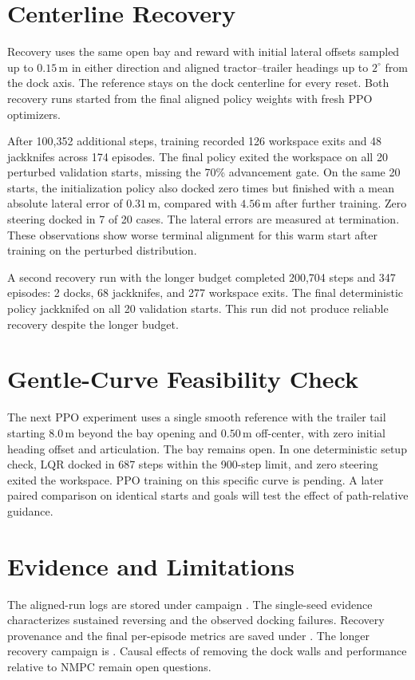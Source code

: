 \documentclass[conference]{IEEEtran}
\begin{document}
\section{Centerline Recovery}
Recovery uses the same open bay and reward with initial lateral offsets
sampled up to $0.15\,\mathrm{m}$ in either direction and aligned
tractor--trailer headings up to $2^\circ$ from the dock axis. The reference
stays on the dock centerline for every reset. Both recovery runs started from
the final aligned policy weights with fresh PPO optimizers.

After 100,352 additional steps, training recorded 126 workspace exits and
48 jackknifes across 174 episodes. The final policy exited the workspace
on all 20 perturbed validation starts, missing the 70\% advancement gate.
On the same 20 starts, the initialization policy also docked zero times
but finished with a mean absolute lateral error of $0.31\,\mathrm{m}$,
compared with $4.56\,\mathrm{m}$ after further training. Zero steering
docked in 7 of 20 cases. The lateral errors are measured at termination.
These observations show worse terminal alignment for this warm start
after training on the perturbed distribution.

A second recovery run with the longer budget completed 200,704 steps and
347 episodes: 2 docks, 68 jackknifes, and 277 workspace exits. The final
deterministic policy jackknifed on all 20 validation starts. This run
did not produce reliable recovery despite the longer budget.

\section{Gentle-Curve Feasibility Check}
The next PPO experiment uses a single smooth reference with the trailer tail
starting $8.0\,\mathrm{m}$ beyond the bay opening and $0.50\,\mathrm{m}$
off-center, with zero initial heading offset and articulation. The bay remains
open. In one deterministic setup check, LQR docked in 687 steps within the
900-step limit, and zero steering exited the workspace. PPO training on
this specific curve is pending. A later paired comparison on identical starts
and goals will test the effect of path-relative guidance.

\section{Evidence and Limitations}
The aligned-run logs are stored under campaign
. The single-seed evidence
characterizes sustained reversing and the observed docking failures.
Recovery provenance and the final per-episode metrics are saved under
.
The longer recovery campaign is
.
Causal effects of removing the dock walls and performance relative to NMPC
remain open questions.
\end{document}
